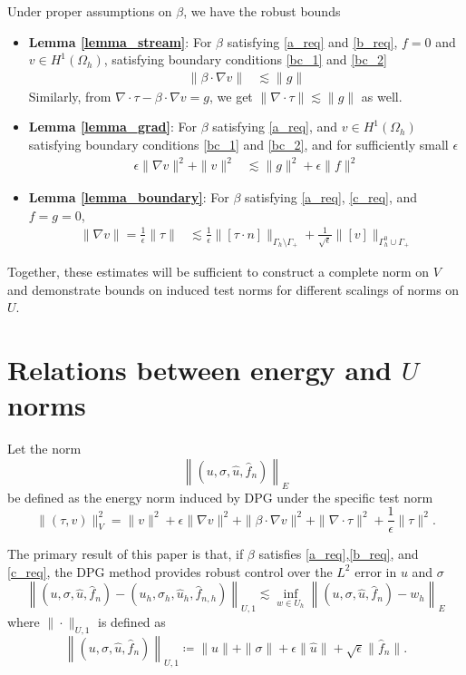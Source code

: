 \documentclass[11pt,onecolumn]{scrartcl}
\newcommand{\grad}{\nabla}
\renewcommand{\div}{\grad \cdot}
\begin{document}
Under proper assumptions on $\beta$, we have the robust bounds
\begin{itemize}
\item \textbf{Lemma \ref{lemma_stream}}: For $\beta$ satisfying \eqref{a_req} and \eqref{b_req}, $f=0$ and $v \in H^1(\Omega_h)$, satisfying boundary conditions \eqref{bc_1} and \eqref{bc_2}
\begin{align*}
\|\beta \cdot \grad v \| &\lesssim \| g\| 
\end{align*}
Similarly, from $\div \tau - \beta\cdot \grad v = g$, we get $\|\div \tau\| \lesssim \|g\|$ as well.  
\item \textbf{Lemma \ref{lemma_grad}}: For $\beta$ satisfying \eqref{a_req}, and $v \in H^1(\Omega_h)$ satisfying boundary conditions \eqref{bc_1} and \eqref{bc_2}, and for sufficiently small $\epsilon$
\begin{align*}
\epsilon \|\grad v\|^2 + \|v\|^2 &\lesssim \|g\|^2 + \epsilon \| f\|^2
\end{align*}
\item \textbf{Lemma \ref{lemma_boundary}}: For $\beta$ satisfying \eqref{a_req}, \eqref{c_req}, and $f=g=0$, 
\begin{align*}
\|\grad v\| = \frac{1}{\epsilon}\|\tau\| &\lesssim \frac{1}{\epsilon} \| [\tau\cdot n]\|_{\Gamma_h \setminus \Gamma_+} + \frac{1}{\sqrt{\epsilon}} \| [v]\|_{\Gamma_h^0 \cup \Gamma_+}
\end{align*}
\end{itemize}
Together, these estimates will be sufficient to construct a complete norm on $V$ and demonstrate bounds on induced test norms for different scalings of norms on $U$.  

\section{Relations between energy and $U$ norms}
\label{sec:main_bounds}

Let the norm 
\[
\left\|\left(u,\sigma,\widehat{u},\widehat{f}_n\right)\right\|_{E}
\]
be defined as the energy norm induced by DPG under the specific test norm
\[
\|\left(\tau, v\right)\|_{V}^2 = \|v\|^2 + \epsilon \|\grad v\|^2 + \|\beta \cdot \grad v\|^2 + \| \div \tau\|^2 + \frac{1}{\epsilon}\|\tau\|^2.
\]

The primary result of this paper is that, if $\beta$ satisfies \ref{a_req},\ref{b_req}, and \ref{c_req}, the DPG method provides robust control over the $L^2$ error in $u$ and $\sigma$
\[
\left\|\left(u,\sigma,\widehat{u},\widehat{f}_n\right)-\left(u_h,\sigma_h,\widehat{u}_h,\widehat{f}_{n,h}\right)\right\|_{U,1} \lesssim \inf_{w\in U_h}\left\|\left(u,\sigma,\widehat{u},\widehat{f}_n\right)-w_h \right\|_{E}
\]
where $\|\cdot \|_{U,1}$ is defined as
\[
\left\|\left(u,\sigma,\widehat{u},\widehat{f}_n\right)\right\|_{U,1} \coloneqq \|u\| + \|\sigma\| + \epsilon\|\widehat{u}\|+\sqrt{\epsilon} \|\widehat{f}_n\|.
\]
\end{document}
